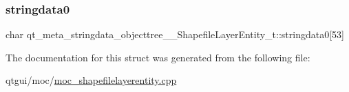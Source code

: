 \subsubsection{\texorpdfstring{stringdata0}{stringdata0}}
{\footnotesize\ttfamily char qt\+\_\+meta\+\_\+stringdata\+\_\+objecttree\+\_\+\+\_\+\+Shapefile\+Layer\+Entity\+\_\+t\+::stringdata0\mbox{[}53\mbox{]}}



The documentation for this struct was generated from the following file\+:\begin{DoxyCompactItemize}
\item 
qtgui/moc/\mbox{\hyperlink{moc__shapefilelayerentity_8cpp}{moc\+\_\+shapefilelayerentity.\+cpp}}\end{DoxyCompactItemize}
